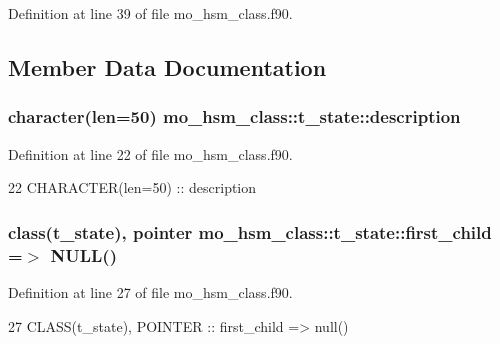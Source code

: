 Definition at line 39 of file mo\+\_\+hsm\+\_\+class.\+f90.



\subsection{Member Data Documentation}
\hypertarget{structmo__hsm__class_1_1t__state_ad0686bddd616c0c58ba9ab69d5fe5bcd}{}
\subsubsection[{description}]{\setlength{\rightskip}{0pt plus 5cm}character(len=50) mo\+\_\+hsm\+\_\+class\+::t\+\_\+state\+::description}\label{structmo__hsm__class_1_1t__state_ad0686bddd616c0c58ba9ab69d5fe5bcd}


Definition at line 22 of file mo\+\_\+hsm\+\_\+class.\+f90.


\begin{DoxyCode}
22     \textcolor{keywordtype}{CHARACTER(len=50)}           :: description
\end{DoxyCode}
\hypertarget{structmo__hsm__class_1_1t__state_a31bbd54f61a830643121688f03ce50c2}{}
\subsubsection[{first\+\_\+child}]{\setlength{\rightskip}{0pt plus 5cm}class({\bf t\+\_\+state}), pointer mo\+\_\+hsm\+\_\+class\+::t\+\_\+state\+::first\+\_\+child =$>$ N\+U\+L\+L()}\label{structmo__hsm__class_1_1t__state_a31bbd54f61a830643121688f03ce50c2}


Definition at line 27 of file mo\+\_\+hsm\+\_\+class.\+f90.


\begin{DoxyCode}
27     \textcolor{keywordtype}{CLASS}(t\_state), \textcolor{keywordtype}{POINTER}     :: first\_child  => null()
\end{DoxyCode}
\hypertarget{structmo__hsm__class_1_1t__state_a70f8607c4cc9e25636b875f34ce0a4b4}{}
